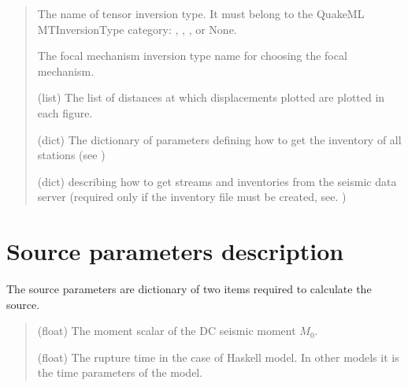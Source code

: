 \documentclass[letterpaper,10pt,english]{sphinxmanual}
\begin{document}
\begin{quote}
\begin{description}
\sphinxAtStartPar
The name of tensor inversion type.
It must belong to the QuakeML MTInversionType category:
, , , or None.

\sphinxAtStartPar
The focal mechanism inversion type name for choosing the focal mechanism.

\sphinxAtStartPar
(list) The list of distances at which displacements plotted are plotted in each figure.

\sphinxAtStartPar
(dict) The dictionary of parameters defining how to get the inventory of all stations
(see {\hyperref[\detokenize{configuration:inventory-parameters}]{}})

\sphinxAtStartPar
(dict) {\hyperref[\detokenize{configuration:stream-parameters}]{}} describing how to get streams and inventories
from the seismic data server (required only if the inventory file must be created,
see. {\hyperref[\detokenize{configuration:stream-parameters}]{}})

\end{description}\end{quote}


\section{Source parameters description}
\label{\detokenize{configuration:source-parameters-description}}
\sphinxAtStartPar
The source parameters are dictionary of two items required to calculate the source.
\begin{quote}\begin{description}
\sphinxAtStartPar
(float) The moment scalar of the DC seismic moment \sphinxhyphen{} \(M_0\).

\sphinxAtStartPar
(float) The rupture time in the case of Haskell model.
In other models it is the time parameters of the model.

\end{description}\end{quote}
\end{document}
